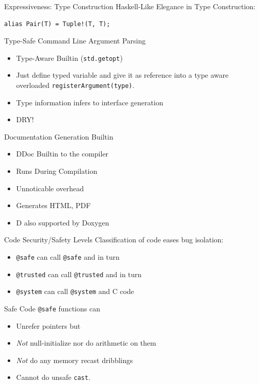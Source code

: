 \documentclass[xcolor=dvipsnames]{beamer}
\begin{document}
\begin{frame}[fragile]{Expressiveness: Type Construction}
  Haskell-Like Elegance in Type Construction:
\begin{lstlisting}[frame=single]
alias Pair(T) = Tuple!(T, T);
\end{lstlisting}
\end{frame}

\begin{frame}[fragile]{Type-Safe Command Line Argument Parsing}
  \begin{itemize}[<+->]
  \item Type-Aware Builtin (\texttt{std.getopt})
  \item Just define typed variable and give it as reference into a type aware
    overloaded \texttt{registerArgument(type)}.
  \item Type information infers to interface generation
  \item DRY!
  \end{itemize}
\end{frame}

\begin{frame}[fragile]{Documentation Generation Builtin}
  \begin{itemize}[<+->]
  \item DDoc Builtin to the compiler
  \item Runs During Compilation
  \item Unnoticable overhead
  \item Generates HTML, PDF
  \item D also supported by Doxygen
  \end{itemize}
\end{frame}

\begin{frame}[fragile]{Code Security/Safety Levels}
  Classification of code eases bug isolation:
  \begin{itemize}[<+->]
  \item \texttt{@safe} can call \texttt{@safe} and in turn
  \item \texttt{@trusted} can call \texttt{@trusted} and in turn
  \item \texttt{@system} can call \texttt{@system} and C code
  \end{itemize}
\end{frame}

\begin{frame}[fragile]{Safe Code}
  \texttt{@safe} functions can
  \begin{itemize}[<+->]
  \item Unrefer pointers but
  \item \emph{Not} null-initialize nor do arithmetic on them
  \item \emph{Not} do any memory recast dribblings
  \item Cannot do unsafe \texttt{cast}.
  \end{itemize}
\end{frame}
\end{document}
